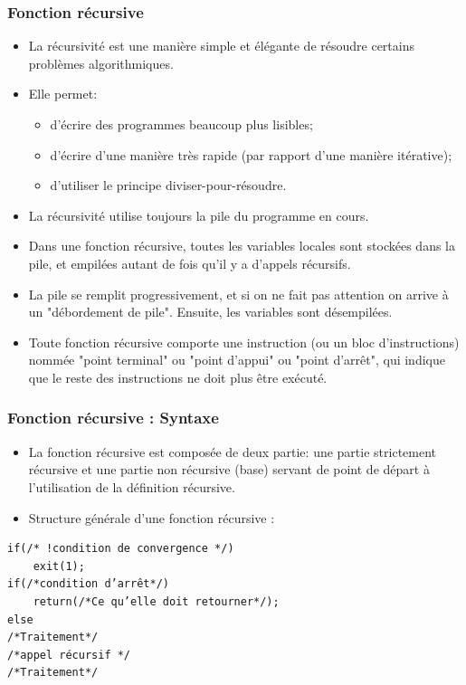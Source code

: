 \documentclass{beamer}
\begin{document}
\begin{frame}[fragile]
\frametitle{Fonction récursive }
\begin{itemize}
\item La récursivité est une manière simple et élégante de résoudre certains problèmes algorithmiques. 
\item Elle permet:
\begin{itemize}
\item  d'écrire des programmes beaucoup plus lisibles; 
\item d'écrire d'une manière très rapide (par rapport d'une manière itérative); 
\item d'utiliser le principe diviser-pour-résoudre.
\end{itemize}
\item  La récursivité utilise toujours la pile du programme en cours. 
\item  Dans une fonction récursive, toutes les variables locales sont stockées dans la pile, et empilées autant de fois qu'il y a d'appels récursifs. 
\item  La pile se remplit progressivement, et si on ne fait pas attention on arrive à un "débordement de pile". Ensuite, les variables sont désempilées. 
\item  Toute fonction récursive comporte une instruction (ou un bloc d'instructions) nommée "point terminal" ou "point d'appui" ou "point d'arrêt", qui indique que le reste des instructions ne doit plus être exécuté.
\end{itemize}
\end{frame}


\begin{frame}[fragile]
\frametitle{Fonction récursive : Syntaxe}
\begin{itemize}
\item La fonction récursive est composée de deux partie: une partie strictement récursive et une partie non récursive (base) servant de point de départ à l'utilisation de la définition récursive. 
\item Structure générale d'une fonction récursive : 
\end{itemize}
\begin{verbatim}
if(/* !condition de convergence */) 
    exit(1); 
if(/*condition d’arrêt*/) 
    return(/*Ce qu’elle doit retourner*/); 
else 
/*Traitement*/
/*appel récursif */
/*Traitement*/
\end{verbatim}

\end{frame}
\end{document}
